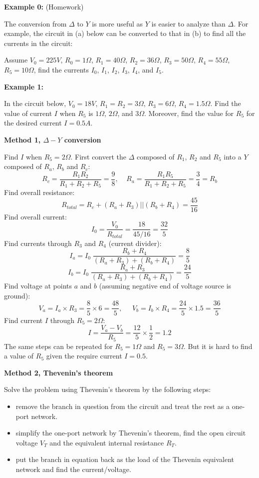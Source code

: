 \begin{itemize}
{\bf Example 0:} (Homework)

The conversion from $\Delta$ to $Y$ is more useful as $Y$ is easier to
analyze than $\Delta$. For example, the circuit in (a) below can be 
converted to that in (b) to find all the currents in the circuit:


Assume $V_0=225 V$, $R_0=1\Omega$, $R_1=40\Omega$, $R_2=36\Omega$, 
$R_3=50\Omega$, $R_4=55\Omega$, $R_5=10\Omega$, find the currents 
$I_0$, $I_1$, $I_2$, $I_3$, $I_4$, and $I_5$. 

\end{itemize}

{\bf Example 1: } 

In the circuit below, $V_0=18V$, $R_1=R_2=3\Omega$, 
$R_3=6\Omega$, $R_4=1.5\Omega$. Find the value of current $I$ when $R_5$
is $1\Omega$, $2\Omega$, and $3\Omega$. Moreover, find the value for 
$R_5$ for the desired current $I=0.5A$.


{\bf Method 1, $\Delta-Y$ conversion}

Find $I$ when $R_5=2\Omega$. First convert the $\Delta$ composed of
$R_1$, $R_2$ and $R_5$ into a $Y$ composed of $R_a$, $R_b$ and $R_c$:
\[ 	R_c=\frac{R_1R_2}{R_1+R_2+R_5}=\frac{9}{8},\;\;\;\;
	R_a=\frac{R_1R_5}{R_1+R_2+R_5}=\frac{3}{4}=R_b	\]
Find overall resistance:
\[ R_{total}=R_c+(R_a+R_3) || (R_b+R_4)=\frac{45}{16}	\]
Find overall current:
\[ I_0=\frac{V_0}{R_{total}}=\frac{18}{45/16}=\frac{32}{5}\]
Find currents through $R_3$ and $R_4$ (current divider):
\[ I_a=I_0\;\frac{R_b+R_4}{(R_a+R_3)+(R_b+R_4)}=\frac{8}{5} \]
\[ I_b=I_0\;\frac{R_a+R_3}{(R_a+R_3)+(R_b+R_4)}=\frac{24}{5}\]
Find voltage at points $a$ and $b$ (assuming negative end of voltage
source is ground):
\[ V_a=I_a \times R_3=\frac{8 }{5} \times 6=\frac{48}{5},\;\;\;\;\;
   V_b=I_b \times R_4=\frac{24}{5} \times 1.5=\frac{36}{5}	\]
Find current $I$ through $R_5=2\Omega$:
\[	I=\frac{V_a-V_b}{R_5}=\frac{12}{5}\times \frac{1}{2}=1.2\]
The same steps can be repeated for $R_5=1\Omega$ and $R_5=3\Omega$. 
But it is hard to find a value of $R_5$ given the require current $I=0.5$.

{\bf Method 2, Thevenin's theorem}

Solve the problem using Thevenin's theorem by the following steps:
\begin{itemize}
\item remove the branch in question from the circuit and treat the rest as
	a one-port network.
\item simplify the one-port network by Thevenin's theorem, find the open
	circuit voltage $V_T$ and the equivalent internal resistance $R_T$.
\item put the branch in equation back as the load of the Thevenin equivalent
	network and find the current/voltage.
\end{itemize}


